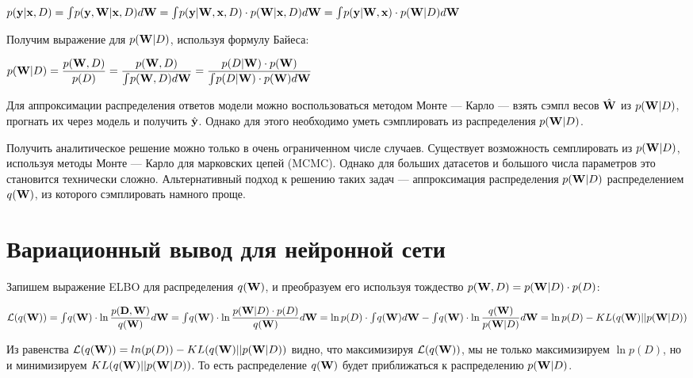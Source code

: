 \documentclass{article}
\begin{document}
$p(\bold{y} | \bold{x}, D) =
\int_{}{} p(\bold{y}, \bold{W} | \bold{x}, D) d\bold{W} =
\int_{}{} p(\bold{y} | \bold{W}, \bold{x}, D) \cdot p(\bold{W} | \bold{x}, D) d\bold{W} = 
\int_{}{} p(\bold{y} | \bold{W}, \bold{x}) \cdot p(\bold{W} | D) d\bold{W}$

Получим выражение для $p(\bold{W}| D)$, используя формулу Байеса:

$p(\bold{W}| D) =
\dfrac{p(\bold{W}, D)}{p(D)} =
\dfrac{p(\bold{W}, D)}{\int_{}{} p(\bold{W}, D) d\bold{W}} =
\dfrac{p(D | \bold{W}) \cdot p(\bold{W})}{\int_{}{} p(D | \bold{W}) \cdot p(\bold{W}) d\bold{W}} $

Для аппроксимации распределения ответов модели можно воспользоваться методом Монте — Карло — взять сэмпл весов $\hat{\bold{W}}$ из $p(\bold{W}| D)$, прогнать их через модель и получить $\hat{\bold{y}}$. Однако для этого необходимо уметь сэмплировать из распределения $p(\bold{W}| D)$.

Получить аналитическое решение можно только в очень ограниченном числе случаев. Существует возможность семплировать из $p(\bold{W}| D)$, используя методы Монте — Карло для марковских цепей (MCMC). Однако для больших датасетов и большого числа параметров это становится технически сложно. Альтернативный подход к решению таких задач — аппроксимация распределения $p(\bold{W}| D)$ распределением $q(\bold{W})$, из которого сэмплировать намного проще.


\section{Вариационный вывод для нейронной сети}
Запишем выражение ELBO для распределения $q(\bold{W})$, и преобразуем его используя тождество $p(\bold{W}, D) = p(\bold{W}| D)\cdot p(D)$:

$
\mathcal{L}(q(\bold{W})) =
\int_{}{} q(\bold{W}) \cdot \ln{\dfrac{p(\bold{D}, \bold{W})}{q(\bold{W})}} d\bold{W} =
\int_{}{} q(\bold{W}) \cdot \ln{\dfrac{p(\bold{W}| D) \cdot p(D)}{q(\bold{W})}} d\bold{W} = 
\ln{p(D)} \cdot \int_{}{} q(\bold{W}) d\bold{W} - \int_{}{} q(\bold{W})\cdot \ln{\dfrac{q(\bold{W})}{p(\bold{W}| D)}} d\bold{W} =
\ln{p(D)} - KL(q(\bold{W}) || p(\bold{W}| D))
$

Из равенства $\mathcal{L}(q(\bold{W})) = ln(p(D)) - KL(q(\bold{W}) || p(\bold{W}| D))$ видно, что максимизируя $\mathcal{L}(q(\bold{W}))$, мы не только максимизируем $\ln {p(D)}$, но и минимизируем $KL(q(\bold{W}) || p(\bold{W}| D))$. То есть распределение $q(\bold{W})$ будет приближаться к распределению $p(\bold{W}| D)$.
\end{document}
